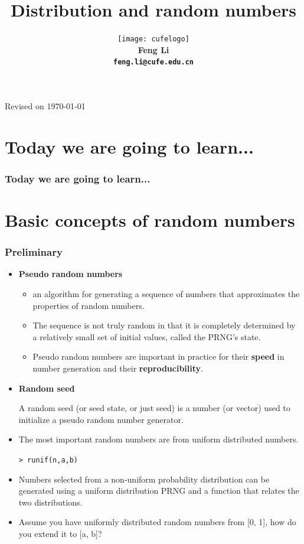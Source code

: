 \documentclass[10pt]{beamer}
\title[Statistical Computing]{{\textbf{Distribution and random numbers}}}
\author[Feng Li]{\texttt{[image: cufelogo]}\\
  \vspace{0.5cm}\textbf{Feng Li\\\texttt{feng.li@cufe.edu.cn}}}
\institute[Stat \& Math, CUFE]{\footnotesize{\textbf{School of
      Statistics and Mathematics\\ Central University of Finance and
      Economics}}}
\date{}
\begin{document}
\begin{frame}[plain]
  \titlepage
  \tiny{Revised on \today}
\end{frame}


\section*{Today we are going to learn...}
\begin{frame}
  \frametitle{Today we are going to learn...}
  \tableofcontents
\end{frame}


\section{Basic concepts of random numbers}
\begin{frame}
  \frametitle{Preliminary}

  \begin{itemize}

  \item \textbf{Pseudo random numbers}
    \begin{itemize}
    \item an algorithm for generating a sequence of numbers that
      approximates the properties of random numbers.

    \item The sequence is not truly random in that it is completely
      determined by a relatively small set of initial values, called
      the PRNG's state.

    \item Pseudo random numbers are important in practice for their
      \textbf{speed} in number generation and their
      \textbf{reproducibility}.

    \end{itemize}



  \item \textbf{Random seed}

    A random seed (or seed state, or just seed) is a number (or
    vector) used to initialize a pseudo random number generator.

  \item The most important random numbers are from uniform
    distributed numbers.

    \texttt{> runif(n,a,b)}

  \item Numbers selected from a non-uniform probability distribution
    can be generated using a uniform distribution PRNG and a function
    that relates the two distributions.


  \item Assume you have uniformly distributed random numbers from [0,
    1], how do you extend it to [a, b]?

  \end{itemize}
\end{frame}
\end{document}
